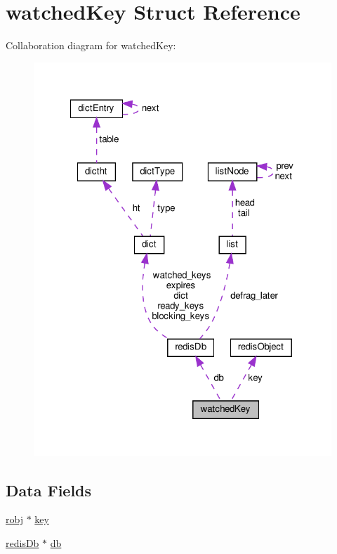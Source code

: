 \hypertarget{structwatched_key}{}\section{watched\+Key Struct Reference}
\label{structwatched_key}


Collaboration diagram for watched\+Key\+:
\nopagebreak
\begin{figure}[H]
\begin{center}
\leavevmode
\includegraphics[width=322pt]{structwatched_key__coll__graph}
\end{center}
\end{figure}
\subsection*{Data Fields}
\begin{DoxyCompactItemize}
\item 
\hyperlink{server_8h_a540f174d2685422fbd7d12e3cd44c8e2}{robj} $\ast$ \hyperlink{structwatched_key_adc0ee0ed345db513fb6fac27511be4f1}{key}
\item 
\hyperlink{structredis_db}{redis\+Db} $\ast$ \hyperlink{structwatched_key_a9bee04e09635a42fef289e42a89f5502}{db}
\end{DoxyCompactItemize}


